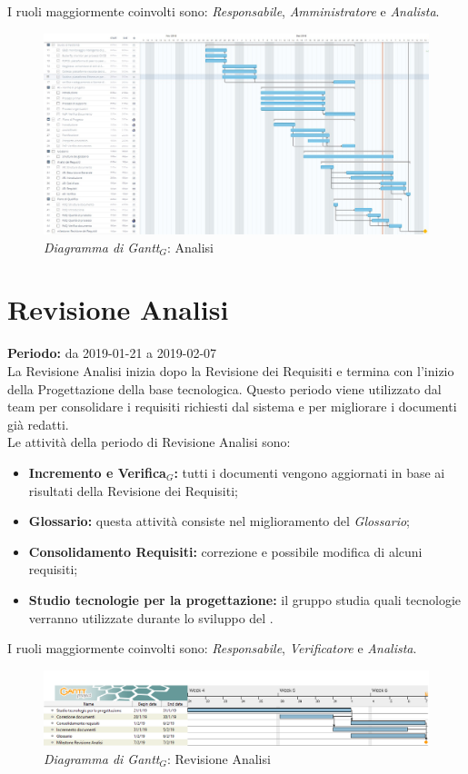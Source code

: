 I ruoli maggiormente coinvolti sono: \textit{Responsabile}, \textit{Amministratore} e \textit{Analista}.
\begin{figure} [h]
    \centering
    \includegraphics[scale=0.3]{./images/analisi.jpg}
    \caption{\textit{Diagramma di Gantt$_{G}$}: Analisi}\label{}
\end{figure}
\section{Revisione Analisi}
\textbf{Periodo:} da 2019-01-21 a 2019-02-07\\
La Revisione Analisi inizia dopo la Revisione dei Requisiti e termina con l’inizio della Progettazione della base tecnologica. Questo periodo viene utilizzato dal team per consolidare i requisiti richiesti dal sistema e per migliorare i documenti già redatti.\\
Le attività della periodo di Revisione Analisi sono:
\begin{itemize}
    \item \textbf{Incremento e Verifica$_{G}$:} tutti i documenti vengono aggiornati in base ai risultati della Revisione dei Requisiti;
    \item \textbf{Glossario:} questa attività consiste nel miglioramento del \textit{Glossario};
    \item \textbf{Consolidamento Requisiti:} correzione e possibile modifica di alcuni requisiti;
    \item \textbf{Studio tecnologie per la progettazione:} il gruppo studia quali tecnologie verranno utilizzate durante lo sviluppo del .  
\end{itemize}
I ruoli maggiormente coinvolti sono: \textit{Responsabile}, \textit{Verificatore} e \textit{Analista}.
\begin{figure} [h]
    \centering
    \includegraphics[scale=0.45]{./images/ZeroSevenGanttRevisioneA.png}
    \caption{\textit{Diagramma di Gantt$_{G}$}: Revisione Analisi }\label{}
\end{figure}
\newpage

